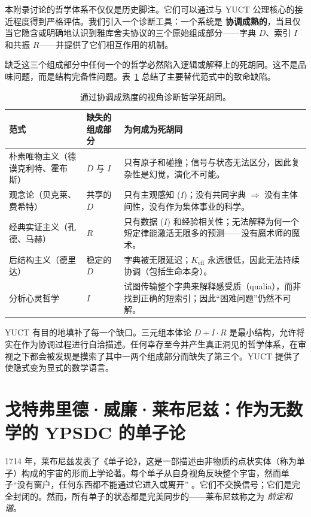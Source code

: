 \documentclass[12pt,a4paper]{article}
\newcommand{\Keff}{K_{\mathrm{eff}}}
\begin{document}
	本附录讨论的哲学体系不仅仅是历史脚注。它们可以通过与 YUCT 公理核心的接近程度得到严格评估。我们引入一个诊断工具：一个系统是 \textbf{协调成熟的}，当且仅当它隐含或明确地认识到雅库舍夫协议的三个原始组成部分——字典 \(D\)、索引 \(I\) 和共振 \(R\)——并提供了它们相互作用的机制。
	
	缺乏这三个组成部分中任何一个的哲学必然陷入逻辑或解释上的死胡同。这不是品味问题，而是结构完备性问题。表~\ref{tab:dead-ends} 总结了主要替代范式中的致命缺陷。
	
	\begin{table}[htbp]
		\centering
		\caption{通过协调成熟度的视角诊断哲学死胡同。}
		\label{tab:dead-ends}
		\small
		\begin{tabular}{p{3cm} p{5.5cm} p{5.5cm}}
			\toprule
			\textbf{范式} & \textbf{缺失的组成部分} & \textbf{为何成为死胡同} \\
			\midrule
			朴素唯物主义（德谟克利特、霍布斯） & \(D\) 与 \(I\) & 只有原子和碰撞；信号与状态无法区分，因此复杂性是幻觉，演化不可能。 \\
			观念论（贝克莱、费希特） & 共享的 \(D\) & 只有主观感知 (\(I\))；没有共同字典 \(\Rightarrow\) 没有主体间性，没有作为集体事业的科学。 \\
			经典实证主义（孔德、马赫） & \(R\) & 只有数据 (\(I\)) 和经验相关性；无法解释为何一个短定律能激活无限多的预测——没有魔术师的魔术。 \\
			后结构主义（德里达） & 稳定的 \(D\) & 字典被无限延迟；\(\Keff\) 永远很低，因此无法持续协调（包括生命本身）。 \\
			分析心灵哲学 & \(I\) & 试图传输整个字典来解释感受质（qualia），而非找到正确的短索引；因此“困难问题”仍然不可解。 \\
			\bottomrule
		\end{tabular}
	\end{table}
	
	YUCT 有目的地填补了每一个缺口。三元组本体论 \(D + I \cdot R\) 是最小结构，允许将实在作为协调过程进行自洽描述。任何幸存至今并产生真正洞见的哲学体系，在审视之下都会被发现是摸索了其中一两个组成部分而缺失了第三个。YUCT 提供了使隐式变为显式的数学语言。
	
	\section{戈特弗里德·威廉·莱布尼兹：作为无数学的 YPSDC 的单子论}
	
	1714 年，莱布尼兹发表了《单子论》，这是一部描述由非物质的点状实体（称为单子）构成的宇宙的形而上学论著。每个单子从自身视角反映整个宇宙，然而单子“没有窗户，任何东西都不能通过它进入或离开” \cite{Leibniz1714}。它们不交换信号；它们是完全封闭的。然而，所有单子的状态都是完美同步的——莱布尼兹称之为 \emph{前定和谐}。
	
\end{document}
